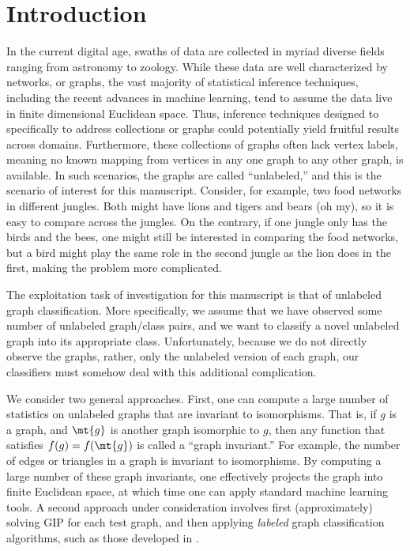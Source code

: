 \section{Introduction}

In the current digital age, swaths of data are collected in myriad diverse fields ranging from astronomy to zoology.  While these data are well characterized by networks, or graphs, the vast majority of statistical inference techniques, including the recent advances in machine learning, tend to assume the data live in finite dimensional Euclidean space.  Thus, inference techniques designed to specifically to address collections or graphs could potentially yield fruitful results across domains.  Furthermore, these collections of graphs often lack vertex labels, meaning no known mapping from vertices in any one graph to any other graph, is available.  In such scenarios, the graphs are called ``unlabeled,'' and this is the scenario of interest for this manuscript.  Consider, for example, two food networks in different jungles.  Both might have lions and tigers and bears (oh my), so it is easy to compare across the jungles.  On the contrary, if one jungle only has the birds and the bees, one might still be interested in comparing the food networks, but a bird might play the same role in the second jungle as the lion does in the first, making the problem more complicated.



The exploitation task of investigation for this manuscript is that of unlabeled graph classification.  More specifically, we assume that we have observed some number of unlabeled graph/class pairs, and we want to classify a novel unlabeled graph into its appropriate class. Unfortunately, because we do not directly observe the graphs, rather, only the unlabeled version of each graph, our classifiers must somehow deal with this additional complication.

We consider two general approaches.  First, one can compute a large number of statistics on unlabeled graphs that are invariant to isomorphisms.  That is, if $g$ is a graph, and $\mt{g}$ is another graph isomorphic to $g$, then any function that satisfies $f(g)=f(\mt{g})$ is called a ``graph invariant.''  For example, the number of edges or triangles in a graph is invariant to isomorphisms.  By computing a large number of these graph invariants, one effectively projects the graph into finite Euclidean space, at which time one can apply standard machine learning tools.  A second approach under consideration involves first (approximately) solving GIP for each test graph, and then applying \emph{labeled} graph classification algorithms, such as those developed in \cite{??}.


